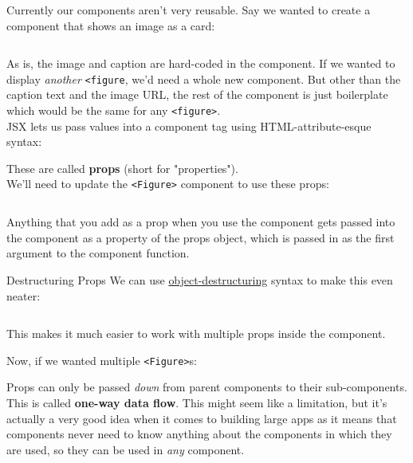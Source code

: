 Currently our components aren't very reusable. Say we wanted to create a component that shows an image as a card:

\inputminted{jsx}{03-props/figures/01-Figure.jsx}

As is, the image and caption are hard-coded in the component. If we wanted to display \textit{another} \texttt{<figure}, we'd need a whole new component. But other than the caption text and the image URL, the rest of the component is just boilerplate which would be the same for any \texttt{<figure>}.
\\

JSX lets us pass values into a component tag using HTML-attribute-esque syntax:


These are called \textbf{props} (short for "properties").
\\

We'll need to update the \texttt{<Figure>} component to use these props:

\inputminted{jsx}{03-props/figures/03-Figure-props.jsx}

Anything that you add as a prop when you use the component gets passed into the component as a property of the props object, which is passed in as the first argument to the component function.

\begin{infobox}{Destructuring Props}
    We can use \href{https://developer.mozilla.org/en-US/docs/Web/JavaScript/Reference/Operators/Destructuring_assignment}{object-destructuring} syntax to make this even neater:

    \inputminted{jsx}{03-props/figures/04-Figure-destructure.jsx}

    This makes it much easier to work with multiple props inside the component.
\end{infobox}

Now, if we wanted multiple \texttt{<Figure>}s:


Props can only be passed \textit{down} from parent components to their sub-components. This is called \textbf{one-way data flow}. This might seem like a limitation, but it's actually a very good idea when it comes to building large apps as it means that components never need to know anything about the components in which they are used, so they can be used in \textit{any} component.
\\

